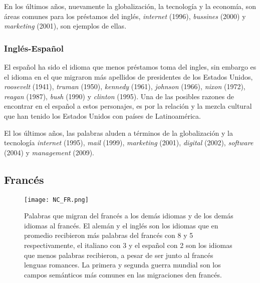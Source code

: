 En los últimos años, nuevamente la globalización, la tecnología y la economía, son áreas comunes para los préstamos del inglés, \textit{internet} (1996), \textit{bussines} (2000) y \textit{marketing} (2001), son ejemplos de ellas. 


\subsubsection*{Inglés-Español} 

El español ha sido el idioma que menos préstamos toma del ingles,  sin  embargo es el idioma en el que migraron más apellidos de presidentes de los Estados Unidos, \textit{roosevelt} (1941), \textit{truman} (1950), \textit{kennedy} (1961), \textit{johnson} (1966),  \textit{nixon} (1972),  \textit{reagan} (1987), \textit{bush} (1990) y \textit{clinton} (1995).  Una de las posibles razones de encontrar en el español a estos personajes,  es por la relación y la mezcla cultural que han tenido los Estados Unidos con países de Latinoamérica.  

El los últimos años, las palabras aluden a términos de la globalización y la tecnología  \textit{internet} (1995), \textit{mail} (1999), \textit{marketing} (2001),  \textit{digital} (2002), \textit{software} (2004) y \textit{management} (2009).  


\subsection{Francés} %

\begin{figure}[h!]
	\centering
	\texttt{[image: NC\_FR.png]}
	\caption{Palabras que migran del francés a los demás idiomas y de los demás idiomas al francés. El alemán y el inglés son los idiomas que en promedio recibieron más palabras del francés  con 8 y 5 respectivamente,  el italiano con 3 y el español con 2 son los idiomas que menos palabras recibieron, a pesar de ser junto al francés lenguas romances. La primera y segunda guerra mundial son los campos semánticos más comunes en las migraciones den francés.}
	\label{fig.NC_FR}
	
	
\end{figure}

